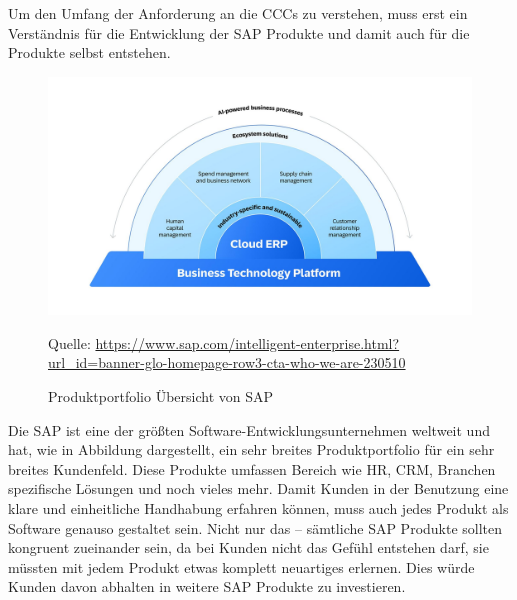 \documentclass[../main.tex]{subfiles}
\begin{document}
Um den Umfang der Anforderung an die \glspl{CCC} zu verstehen, muss erst ein Verständnis für die Entwicklung der SAP Produkte und damit auch für die Produkte selbst entstehen.

\begin{figure}[ht]
    \centering
    \includegraphics[scale=.21]{"bilder/produktportfolio.jpg"}
    \caption{Produktportfolio Übersicht von SAP}
    \footnotesize Quelle: \url{https://www.sap.com/intelligent-enterprise.html?url_id=banner-glo-homepage-row3-cta-who-we-are-230510}
    \label{fig:produktportfolio}
\end{figure}

Die SAP ist eine der größten Software-Entwicklungsunternehmen weltweit und hat, wie in Abbildung  dargestellt, ein sehr breites Produktportfolio für ein sehr breites Kundenfeld.
\cite{CorporateFactSheet}
Diese Produkte umfassen Bereich wie \gls{HR}, \gls{CRM}, Branchen spezifische Lösungen und noch vieles mehr.
Damit Kunden in der Benutzung eine klare und einheitliche Handhabung erfahren können, muss auch jedes Produkt als Software genauso gestaltet sein.
Nicht nur das -- sämtliche SAP Produkte sollten kongruent zueinander sein, da bei Kunden nicht das Gefühl entstehen darf, sie müssten mit jedem Produkt etwas komplett neuartiges erlernen.
Dies würde Kunden davon abhalten in weitere SAP Produkte zu investieren.
\cite{Hier ne passende quelle waere cool}
\end{document}
